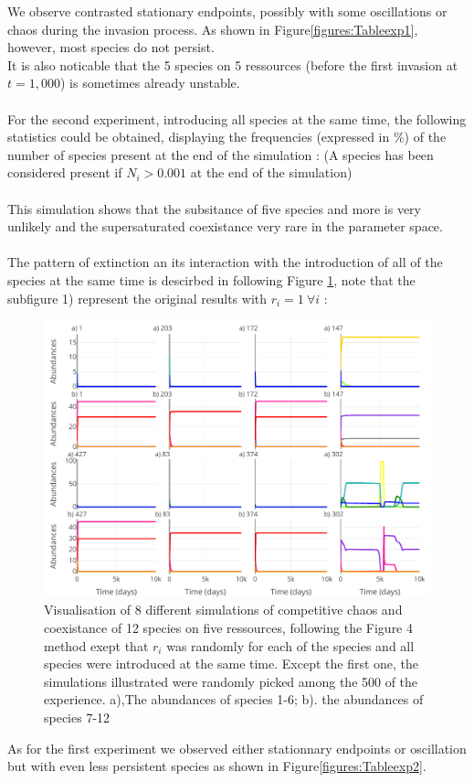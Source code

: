We observe contrasted stationary endpoints, possibly with some oscillations or 
chaos during the invasion process. As shown in Figure\ref{figures:Tableexp1}, 
however, most species do not persist.\\
It is also noticable that the 5 species on 5 ressources (before the first 
invasion at $t=1,000$) is sometimes already unstable.\\
\\
For the second experiment, introducing all species at the same time, the 
following statistics could be obtained, displaying the frequencies (expressed in 
\%) of the number of species present at the end of the simulation : (A species 
has been considered present if $N_i > 0.001$ at the end of the simulation) \\


\\
This simulation shows that the subsitance of five species and more is very 
unlikely and the supersaturated coexistance very rare in the parameter space.\\
\\
The pattern of extinction an its interaction with the introduction of all of the 
species at the same time is descirbed in following Figure \ref{figures:Figexp2}, 
note that the subfigure 1) represent the original results with $r_i=1 ~\forall 
i$ : 
\begin{figure}[H]
\begin{center} 
 \includegraphics[width=1\textwidth]{../Code/Figures/Figure_exp2.pdf}
  \caption{Visualisation of 8 different simulations of competitive chaos and 
coexistance of 12 species on five ressources, following the Figure 4 method 
exept that $r_i$ was randomly for each of the species and all species were 
introduced at the same time. Except the first one, the simulations illustrated 
were randomly picked among the 500 of the experience. a),The abundances of 
species 1-6; b). the abundances of species 7-12}
  \label{figures:Figexp2}
\end{center}
  \end{figure}
As for the first experiment we observed either stationnary endpoints or 
oscillation but with even less persistent species as shown in 
Figure\ref{figures:Tableexp2}.
